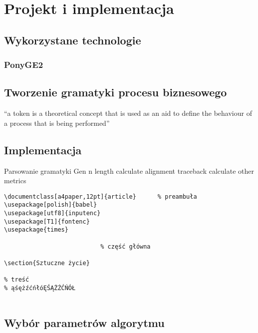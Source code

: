 \chapter{Projekt i implementacja}

\section{Wykorzystane technologie}
\subsection{PonyGE2}

\section{Tworzenie gramatyki procesu biznesowego}

“a token is a theoretical concept that is used as an aid to define the behaviour of a process that is being
performed”

\section{Implementacja}

Parsowanie gramatyki
Gen n length
calculate alignment
traceback
calculate other metrics
\begin{lstlisting}
\documentclass[a4paper,12pt]{article}      % preambuła
\usepackage[polish]{babel}
\usepackage[utf8]{inputenc}
\usepackage[T1]{fontenc}
\usepackage{times}

                           % część główna

\section{Sztuczne życie}

% treść
% ąśężźćńłóĘŚĄŻŹĆŃÓŁ


\end{lstlisting}

\section{Wybór parametrów algorytmu}
